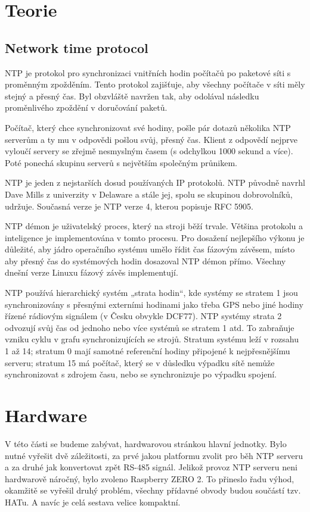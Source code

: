 \section{Teorie}
\subsection{Network time protocol}

NTP je protokol pro synchronizaci vnitřních hodin počítačů po paketové síti s proměnným zpožděním. Tento protokol zajišťuje, aby všechny počítače v síti měly stejný a přesný čas. Byl obzvláště navržen tak, aby odolával následku proměnlivého zpoždění v doručování paketů.

Počítač, který chce synchronizovat své hodiny, pošle pár dotazů několika NTP serverům a ty mu v odpovědi pošlou svůj, přesný čas. Klient z odpovědí nejprve vyloučí servery se zřejmě nesmyslným časem (s odchylkou 1000 sekund a více). Poté ponechá skupinu serverů s největším společným průnikem.

NTP je jeden z nejstarších dosud používaných IP protokolů. NTP původně navrhl Dave Mills z univerzity v Delaware a stále jej, spolu se skupinou dobrovolníků, udržuje. Současná verze je NTP verze 4, kterou popisuje RFC 5905.

NTP démon je uživatelský proces, který na stroji běží trvale. Většina protokolu a inteligence je implementována v tomto procesu. Pro dosažení nejlepšího výkonu je důležité, aby jádro operačního systému umělo řídit čas fázovým závěsem, místo aby přesný čas do systémových hodin dosazoval NTP démon přímo. Všechny dnešní verze Linuxu fázový závěs implementují.

NTP používá hierarchický systém „strata hodin“, kde systémy se stratem 1 jsou synchronizovány s přesnými externími hodinami jako třeba GPS nebo jiné hodiny řízené rádiovým signálem (v Česku obvykle DCF77). NTP systémy strata 2 odvozují svůj čas od jednoho nebo více systémů se stratem 1 atd. To zabraňuje vzniku cyklu v grafu synchronizujících se strojů. Stratum systému leží v rozsahu 1 až 14; stratum 0 mají samotné referenční hodiny připojené k nejpřesnějšímu serveru; stratum 15 má počítač, který se v důsledku výpadku sítě nemůže synchronizovat s zdrojem času, nebo se synchronizuje po výpadku spojení.

\section{Hardware}

    V této části se budeme zabývat, hardwarovou stránkou hlavní jednotky. Bylo nutné
    vyřešit dvě záležitosti, za prvé jakou platformu zvolit pro běh NTP serveru a za druhé
    jak konvertovat zpět RS-485 signál. Jelikož provoz NTP serveru neni hardwarově
    náročný, bylo zvoleno Raspberry ZERO 2. To přineslo řadu výhod, okamžitě se vyřešil
    druhý problém, všechny přídavné obvody budou součástí tzv. HATu. A navíc je celá
    sestava velice kompaktní.
